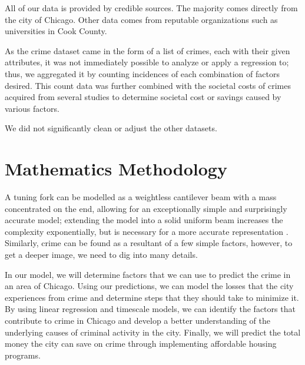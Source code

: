 \documentclass{article}
\begin{document}
\begin{onehalfspacing}
All of our data is provided by credible sources. The majority comes directly from the city of Chicago. Other data comes from reputable organizations such as universities in Cook County. 

As the crime dataset came in the form of a list of crimes, each with their given attributes, it was not immediately possible to analyze or apply a regression to; thus, we aggregated it by counting incidences of each combination of factors desired. This count data was further combined with the societal costs of crimes acquired from several studies to determine societal cost or savings caused by various factors.

We did not significantly clean or adjust the other datasets.

\section{Mathematics Methodology}
A tuning fork can be modelled as a weightless cantilever beam with a mass concentrated on the end, allowing for an exceptionally simple and surprisingly accurate model; extending the model into a solid uniform beam increases the complexity exponentially, but is necessary for a more accurate representation \cite{Tkachenko}. Similarly, crime can be found as a resultant of a few simple factors, however, to get a deeper image, we need to dig into many details. 

In our model, we will determine factors that we can use to predict the crime in an area of Chicago. Using our predictions, we can model the losses that the city experiences from crime and determine steps that they should take to minimize it. By using linear regression and timescale models, we can identify the factors that contribute to crime in Chicago and develop a better understanding of the underlying causes of criminal activity in the city. Finally, we will predict the total money the city can save on crime through implementing affordable housing programs.

\end{onehalfspacing}
\end{document}
